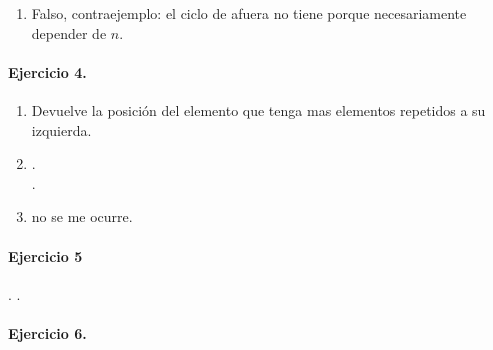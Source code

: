 \documentclass{article}
\begin{document}
\begin{enumerate}[label=\alph*)]
\item Falso, contraejemplo: el ciclo de afuera no tiene porque necesariamente depender de $n$.
\end{enumerate}
\paragraph{Ejercicio 4.}
\begin{enumerate}[label=\alph*)]
\item Devuelve la posición del elemento que tenga mas elementos repetidos a su izquierda.
\item .\\ .
\item no se me ocurre.
\end{enumerate}
\paragraph{Ejercicio 5}.
.
\paragraph{Ejercicio 6.}
\end{document}
